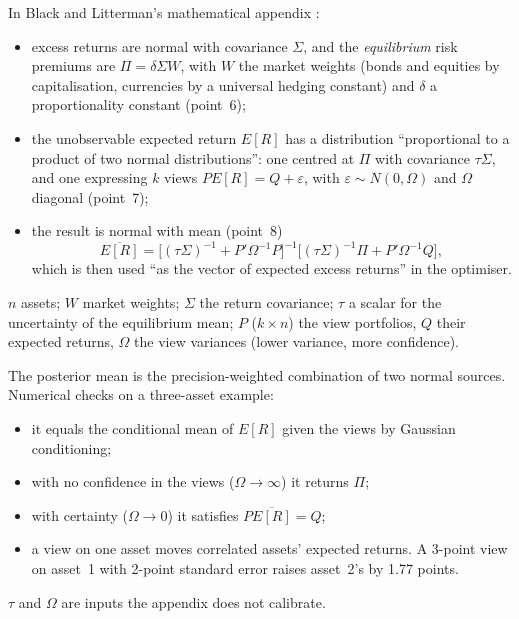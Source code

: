 \begin{qfmodel}\label{mod:black-litterman}
 In Black and Litterman's mathematical appendix \citep[Goldman Sachs Fixed Income Research, October 1991, Appendix, points~1--8, pp.~37--38]{alpha-black}:
\begin{itemize}
\item excess returns are normal with covariance $\Sigma$, and the \emph{equilibrium} risk premiums are $\Pi=\delta\Sigma W$, with $W$ the market weights (bonds and equities by capitalisation, currencies by a universal hedging constant) and $\delta$ a proportionality constant (point~6);
\item the unobservable expected return $E[R]$ has a distribution ``proportional to a product of two normal distributions'': one centred at $\Pi$ with covariance $\tau\Sigma$, and one expressing $k$ views $PE[R]=Q+\varepsilon$, with $\varepsilon\sim N(0,\Omega)$ and $\Omega$ diagonal (point~7);
\item the result is normal with mean (point~8)
\[ \overline{E[R]}=\big[(\tau\Sigma)^{-1}+P'\Omega^{-1}P\big]^{-1}\big[(\tau\Sigma)^{-1}\Pi+P'\Omega^{-1}Q\big], \]
which is then used ``as the vector of expected excess returns'' in the optimiser.
\end{itemize}

 $n$ assets; $W$ market weights; $\Sigma$ the return covariance; $\tau$ a scalar for the uncertainty of the equilibrium mean; $P$ ($k\times n$) the view portfolios, $Q$ their expected returns, $\Omega$ the view variances (lower variance, more confidence).

 The posterior mean is the precision-weighted combination of two normal sources. Numerical checks on a three-asset example:
\begin{itemize}
\item it equals the conditional mean of $E[R]$ given the views by Gaussian conditioning;
\item with no confidence in the views ($\Omega\to\infty$) it returns $\Pi$;
\item with certainty ($\Omega\to0$) it satisfies $P\overline{E[R]}=Q$;
\item a view on one asset moves correlated assets' expected returns. A 3-point view on asset~1 with 2-point standard error raises asset~2's by 1.77 points.
\end{itemize}
$\tau$ and $\Omega$ are inputs the appendix does not calibrate.


\end{qfmodel}
